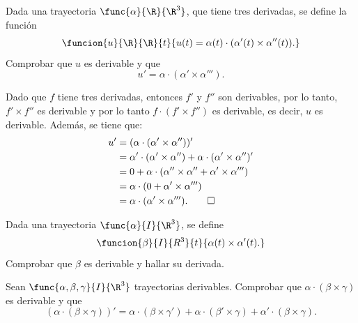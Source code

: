 \documentclass[a4,11pt]{aleph-examen}
\begin{document}
\begin{preguntas}
\item
    Dada una trayectoria $\func{\alpha}{\R}{\R^3}$, que tiene tres derivadas, se define la función
    \[
        \funcion{u}{\R}{\R}{t}{u(t)=
            \alpha(t)\cdot(\alpha'(t)\times \alpha''(t)).
        }
    \]
    Comprobar que $u$ es derivable y que
    \[
        u'=\alpha\cdot(\alpha'\times \alpha''').
    \]

\begin{respuesta}
    Dado que $f$ tiene tres derivadas, entonces $f'$ y $f''$ son derivables, por lo tanto, $f'\times f''$ es derivable y por lo tanto $f\cdot(f'\times f'')$ es derivable, es decir, $u$ es derivable. Además, se tiene que:
    \begin{align*}
        u' 
            & = (\alpha\cdot(\alpha'\times \alpha''))'\\
            & = \alpha'\cdot(\alpha'\times \alpha'')+\alpha\cdot(\alpha'\times \alpha'')'\\
            & = 0 + \alpha\cdot(\alpha''\times \alpha'' + \alpha'\times \alpha''')\\
            & = \alpha\cdot(0 + \alpha'\times \alpha''')\\
            & = \alpha\cdot(\alpha'\times \alpha''').\qedhere
    \end{align*}
\end{respuesta}

\item
    Dada una trayectoria $\func{\alpha}{I}{\R^3}$, se define
    \[
        \funcion{\beta}{I}{R^3}{t}{\alpha(t)\times \alpha'(t).}
    \]
    Comprobar que $\beta$ es derivable y hallar su derivada.

\item 
    Sean $\func{\alpha,\beta,\gamma}{I}{\R^3}$ trayectorias derivables. Comprobar que $\alpha \cdot (\beta \times \gamma)$ es derivable y que
    \[
        (\alpha \cdot (\beta \times \gamma))' = \alpha \cdot (\beta \times \gamma') + \alpha \cdot (\beta' \times \gamma) + \alpha' \cdot (\beta \times \gamma).
    \]
    

\end{preguntas}
\end{document}
